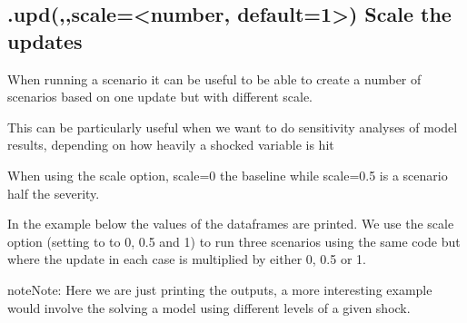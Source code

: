 \documentclass[letterpaper,10pt,english]{jupyterBook}
\begin{document}
\subsection{.upd(,,scale=<number, default=1>) Scale the updates}
\label{\detokenize{content/04_PythonEssentials/UpdateCommand:upd-scale-number-default-1-scale-the-updates}}
\sphinxAtStartPar
When running a scenario it can be useful to be able to create a number of scenarios based on one update but with different scale.

\sphinxAtStartPar
This can be particularly useful when we want to do sensitivity analyses of model results, depending on how heavily a shocked variable is hit

\sphinxAtStartPar
When using the scale option, scale=0  the baseline while scale=0.5 is a scenario half
the severity.

\sphinxAtStartPar
In the example below the values of the dataframes are printed. We use the scale option (setting to to 0, 0.5 and 1) to run three scenarios using the same code but where the update in each case is multiplied by either 0, 0.5 or 1.

\begin{sphinxadmonition}{note}{Note:}
\sphinxAtStartPar
Here we are just printing the outputs, a more interesting example would involve the solving a  model using different levels of a given shock.
\end{sphinxadmonition}
\end{document}
